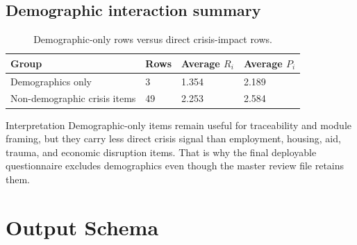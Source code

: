 \documentclass[12pt]{article}
\begin{document}
\subsection{Demographic interaction summary}

\begin{table}[H]
\centering
\begin{tabularx}{0.78\textwidth}{L{0.34\textwidth} R{0.10\textwidth} R{0.12\textwidth} R{0.12\textwidth}}
\toprule
Group & Rows & Average $R_i$ & Average $P_i$ \\
\midrule
Demographics only & 3 & 1.354 & 2.189 \\
Non-demographic crisis items & 49 & 2.253 & 2.584 \\
\bottomrule
\end{tabularx}
\caption{Demographic-only rows versus direct crisis-impact rows.}
\end{table}

\begin{psidbox}{Interpretation}
Demographic-only items remain useful for traceability and module framing, but they carry less direct crisis signal than employment, housing, aid, trauma, and economic disruption items. That is why the final deployable questionnaire excludes demographics even though the master review file retains them.
\end{psidbox}

\section{Output Schema}
\end{document}
